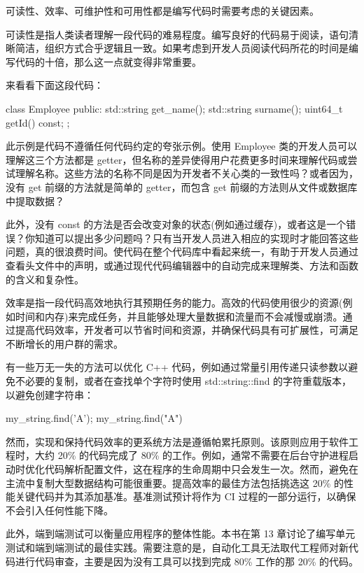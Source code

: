 
可读性、效率、可维护性和可用性都是编写代码时需要考虑的关键因素。


可读性是指人类读者理解一段代码的难易程度。编写良好的代码易于阅读，语句清晰简洁，组织方式合乎逻辑且一致。如果考虑到开发人员阅读代码所花的时间是编写代码的十倍，那么这一点就变得非常重要。

来看看下面这段代码：

\begin{cpp}
class Employee {
public:
    std::string get_name();
    std::string surname();
    uint64_t getId() const;
};
\end{cpp}

此示例是代码不遵循任何代码约定的夸张示例。使用 Employee 类的开发人员可以理解这三个方法都是 getter，但名称的差异使得用户花费更多时间来理解代码或尝试理解名称。这些方法的名称不同是因为开发者不关心类的一致性吗？或者因为，没有 get 前缀的方法就是简单的 getter，而包含 get 前缀的方法则从文件或数据库中提取数据？

此外，没有 const 的方法是否会改变对象的状态(例如通过缓存)，或者这是一个错误？你知道可以提出多少问题吗？只有当开发人员进入相应的实现时才能回答这些问题，真的很浪费时间。使代码在整个代码库中看起来统一，有助于开发人员通过查看头文件中的声明，或通过现代代码编辑器中的自动完成来理解类、方法和函数的含义和复杂性。


效率是指一段代码高效地执行其预期任务的能力。高效的代码使用很少的资源(例如时间和内存)来完成任务，并且能够处理大量数据和流量而不会减慢或崩溃。通过提高代码效率，开发者可以节省时间和资源，并确保代码具有可扩展性，可满足不断增长的用户群的需求。

有一些万无一失的方法可以优化 C++ 代码，例如通过常量引用传递只读参数以避免不必要的复制，或者在查找单个字符时使用 std::string::find 的字符重载版本，以避免创建字符串：

\begin{cpp}
my_string.find('A');
my_string.find("A")
\end{cpp}

然而，实现和保持代码效率的更系统方法是遵循帕累托原则。该原则应用于软件工程时，大约 20\% 的代码完成了 80\% 的工作。例如，通常不需要在后台守护进程启动时优化代码解析配置文件，这在程序的生命周期中只会发生一次。然而，避免在主流中复制大型数据结构可能很重要。提高效率的最佳方法包括挑选这 20\% 的性能关键代码并为其添加基准。基准测试预计将作为 CI 过程的一部分运行，以确保不会引入任何性能下降。

此外，端到端测试可以衡量应用程序的整体性能。本书在第 13 章讨论了编写单元测试和端到端测试的最佳实践。需要注意的是，自动化工具无法取代工程师对新代码进行代码审查，主要是因为没有工具可以找到完成 80\% 工作的那 20\% 的代码。


